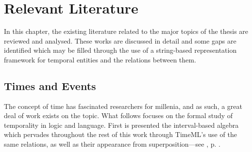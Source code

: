 \documentclass[a4paper,12pt,leqno]{article}
\begin{document}
\section{Relevant Literature}\label{sec:litreview}
In this chapter, the existing literature related to the major topics of the thesis are reviewed and analysed. These works are discussed in detail and some gaps are identified which may be filled through the use of a string-based representation framework for temporal entities and the relations between them.
\subsection{Times and Events}\label{sub:timesevents}
The concept of time has fascinated researchers for millenia, and as such, a great deal of work exists on the topic. What follows focuses on the formal study of temporality in logic and language. First is presented the interval-based algebra which pervades throughout the rest of this work through TimeML's use of the same relations, as well as their appearance from superposition---see , p. \pageref{tab:allen-rels-strings}.
\end{document}
